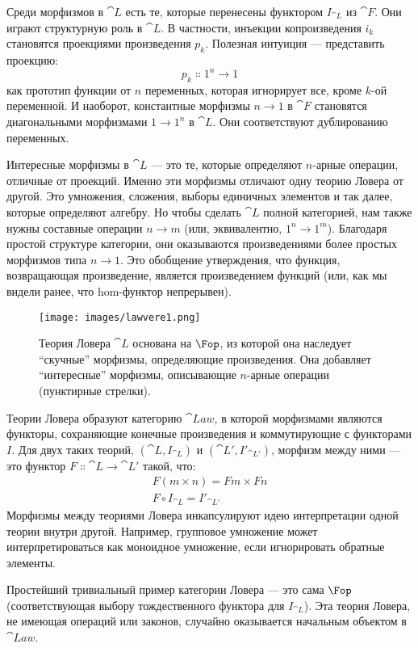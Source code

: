 Среди морфизмов в $\cat{L}$ есть те, которые перенесены функтором
$I_{\cat{L}}$ из $\cat{F}$. Они играют структурную роль в $\cat{L}$. В
частности, инъекции копроизведения $i_k$ становятся проекциями произведения
$p_k$. Полезная интуиция — представить проекцию:
\[p_k \Colon 1^n \to 1\]
как прототип функции от $n$ переменных, которая игнорирует все, кроме
$k$-ой переменной. И наоборот, константные морфизмы $n \to 1$
в $\cat{F}$ становятся диагональными морфизмами $1 \to 1^n$ в
$\cat{L}$. Они соответствуют дублированию переменных.

Интересные морфизмы в $\cat{L}$ — это те, которые определяют $n$-арные
операции, отличные от проекций. Именно эти морфизмы отличают
одну теорию Ловера от другой. Это умножения,
сложения, выборы единичных элементов и так далее, которые определяют
алгебру. Но чтобы сделать $\cat{L}$ полной категорией, нам также нужны составные
операции $n \to m$ (или, эквивалентно,
$1^n \to 1^m$). Благодаря простой структуре
категории, они оказываются произведениями более простых морфизмов
типа $n \to 1$. Это обобщение
утверждения, что функция, возвращающая произведение, является произведением
функций (или, как мы видели ранее, что hom-функтор
непрерывен).

\begin{figure}[H]
  \centering
  \texttt{[image: images/lawvere1.png]}
  \caption{Теория Ловера $\cat{L}$ основана на $\Fop$, из которой
    она наследует ``скучные'' морфизмы, определяющие произведения. Она добавляет
    ``интересные'' морфизмы, описывающие $n$-арные операции (пунктирные
    стрелки).}
\end{figure}

Теории Ловера образуют категорию $\cat{Law}$, в которой морфизмами являются
функторы, сохраняющие конечные произведения и коммутирующие с функторами
$I$. Для двух таких теорий, $(\cat{L}, I_{\cat{L}})$ и
$(\cat{L'}, I'_{\cat{L'}})$, морфизм между ними — это
функтор $F \Colon \cat{L} \to \cat{L'}$ такой, что:
\begin{gather*}
  F (m \times n) = F m \times F n \\
  F \circ I_{\cat{L}} = I'_{\cat{L'}}
\end{gather*}
Морфизмы между теориями Ловера инкапсулируют идею
интерпретации одной теории внутри другой. Например, групповое
умножение может интерпретироваться как моноидное умножение, если игнорировать
обратные элементы.

Простейший тривиальный пример категории Ловера — это
сама $\Fop$ (соответствующая выбору
тождественного функтора для $I_{\cat{L}}$). Эта теория Ловера, не имеющая
операций или законов, случайно оказывается начальным объектом в $\cat{Law}$.

